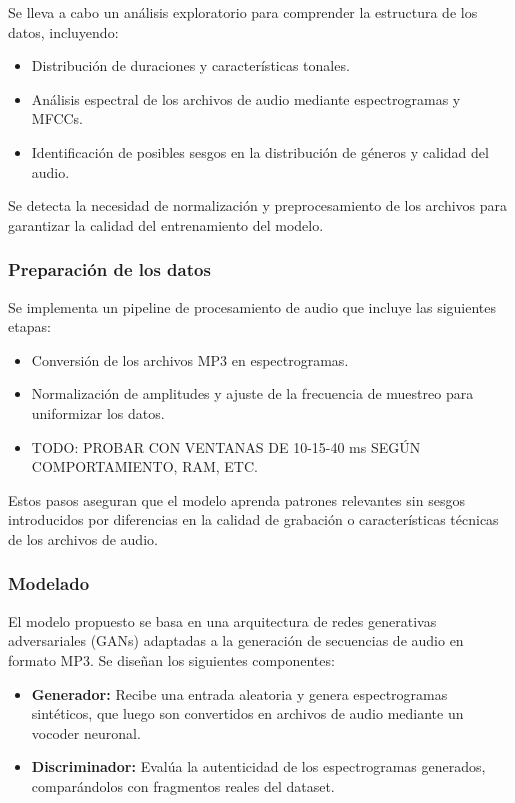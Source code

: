Se lleva a cabo un análisis exploratorio para comprender la estructura de los datos, incluyendo:
\begin{itemize}
    \item Distribución de duraciones y características tonales.
    \item Análisis espectral de los archivos de audio mediante espectrogramas y MFCCs.
    \item Identificación de posibles sesgos en la distribución de géneros y calidad del audio.
\end{itemize}

Se detecta la necesidad de normalización y preprocesamiento de los archivos para garantizar la calidad del entrenamiento del modelo.

\subsubsection{Preparación de los datos}

Se implementa un pipeline de procesamiento de audio que incluye las siguientes etapas:
\begin{itemize}
    \item Conversión de los archivos MP3 en espectrogramas.
    \item Normalización de amplitudes y ajuste de la frecuencia de muestreo para uniformizar los datos.
    \item TODO: PROBAR CON VENTANAS DE 10-15-40 ms SEGÚN COMPORTAMIENTO, RAM, ETC.
\end{itemize}

Estos pasos aseguran que el modelo aprenda patrones relevantes sin sesgos introducidos por diferencias en la calidad de grabación o características técnicas de los archivos de audio.

\subsubsection{Modelado}

El modelo propuesto se basa en una arquitectura de redes generativas adversariales (GANs) adaptadas a la generación de secuencias de audio en formato MP3. Se diseñan los siguientes componentes:
\begin{itemize}
    \item \textbf{Generador:} Recibe una entrada aleatoria y genera espectrogramas sintéticos, que luego son convertidos en archivos de audio mediante un vocoder neuronal.
    \item \textbf{Discriminador:} Evalúa la autenticidad de los espectrogramas generados, comparándolos con fragmentos reales del dataset.
\end{itemize}

